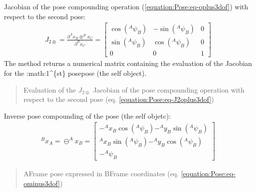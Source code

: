 \documentclass[letterpaper,10pt,english]{sphinxmanual}
\begin{document}
\begin{fulllineitems}
\begin{fulllineitems}
\label{\detokenize{Pose:Pose.Pose3D.J_2oplus}}
\pysigstartsignatures
{}
\pysigstopsignatures
\sphinxAtStartPar
Jacobian of the pose compounding operation (\eqref{equation:Pose:eq-oplus3dof}) with respect to the second pose:
\begin{equation}\label{equation:Pose:eq-J2oplus3dof}
\begin{split}J_{2\oplus}=\frac{\partial  ^Ax_B \oplus ^Bx_C}{\partial ^Bx_C} =
\begin{bmatrix}
    \cos(^A\psi_B) & -\sin(^A\psi_B) & 0  \\
    \sin(^A\psi_B) & \cos(^A\psi_B) & 0  \\
    0 & 0 & 1
\end{bmatrix}\end{split}
\end{equation}
\sphinxAtStartPar
The method returns a numerical matrix containing the evaluation of the Jacobian for the :math:{\color{red}\bfseries{}\textasciigrave{}}1\textasciicircum{}\{st\} posepose  (the self object).
\begin{quote}\begin{description}
\sphinxAtStartPar
Evaluation of the \(J_{2\oplus}\) Jacobian of the pose compounding operation with respect to the second pose (eq. \eqref{equation:Pose:eq-J2oplus3dof})

\end{description}\end{quote}

\end{fulllineitems}


\begin{fulllineitems}
\label{\detokenize{Pose:Pose.Pose3D.ominus}}
\pysigstartsignatures
{}
\pysigstopsignatures
\sphinxAtStartPar
Inverse pose compounding of the  pose (the self objetc):
\begin{equation}\label{equation:Pose:eq-ominus3dof}
\begin{split}^Bx_A = \ominus ^Ax_B =
\begin{bmatrix}
    -^Ax_B \cos(^A\psi_B) - ^Ay_B \sin(^A\psi_B) \\
    ^Ax_B \sin(^A\psi_B) - ^Ay_B \cos(^A\psi_B) \\
    -^A\psi_B
\end{bmatrix}\end{split}
\end{equation}\begin{quote}\begin{description}
\sphinxAtStartPar
A\sphinxhyphen{}Frame pose expressed in B\sphinxhyphen{}Frame coordinates (eq. \eqref{equation:Pose:eq-ominus3dof})


\end{description}
\end{quote}
\end{fulllineitems}
\end{fulllineitems}
\end{document}
